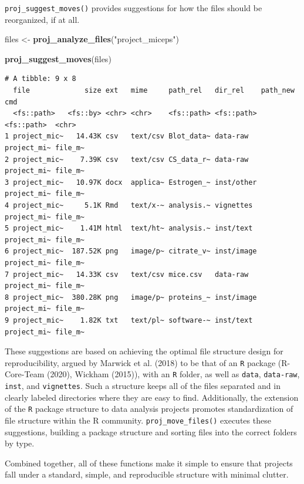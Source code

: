 \documentclass[12pt,twoside]{reedthesis}
\newenvironment{Shaded}{\begin{snugshade}}{\end{snugshade}}
\newcommand{\KeywordTok}[1]{\textcolor[rgb]{0.13,0.29,0.53}{\textbf{#1}}}
\newcommand{\StringTok}[1]{\textcolor[rgb]{0.31,0.60,0.02}{#1}}
\newcommand{\NormalTok}[1]{#1}
\begin{document}
\texttt{proj\_suggest\_moves()} provides suggestions for how the files
should be reorganized, if at all.
\begin{Shaded}
\begin{Highlighting}[]
\NormalTok{files <-}\StringTok{ }\KeywordTok{proj_analyze_files}\NormalTok{(}\StringTok{"project_miceps"}\NormalTok{)}

\KeywordTok{proj_suggest_moves}\NormalTok{(files)}
\end{Highlighting}
\end{Shaded}
\begin{verbatim}
# A tibble: 9 x 8
  file             size ext   mime     path_rel   dir_rel    path_new    cmd    
  <fs::path>   <fs::by> <chr> <chr>    <fs::path> <fs::path> <fs::path>  <chr>  
1 project_mic~   14.43K csv   text/csv Blot_data~ data-raw   project_mi~ file_m~
2 project_mic~    7.39K csv   text/csv CS_data_r~ data-raw   project_mi~ file_m~
3 project_mic~   10.97K docx  applica~ Estrogen_~ inst/other project_mi~ file_m~
4 project_mic~     5.1K Rmd   text/x-~ analysis.~ vignettes  project_mi~ file_m~
5 project_mic~    1.41M html  text/ht~ analysis.~ inst/text  project_mi~ file_m~
6 project_mic~  187.52K png   image/p~ citrate_v~ inst/image project_mi~ file_m~
7 project_mic~   14.33K csv   text/csv mice.csv   data-raw   project_mi~ file_m~
8 project_mic~  380.28K png   image/p~ proteins_~ inst/image project_mi~ file_m~
9 project_mic~    1.82K txt   text/pl~ software-~ inst/text  project_mi~ file_m~
\end{verbatim}
These suggestions are based on achieving the optimal file structure
design for reproducibility, argued by Marwick et al. (2018) to be that
of an \texttt{R} package (R-Core-Team (2020), Wickham (2015)), with an
\texttt{R} folder, as well as \texttt{data}, \texttt{data-raw},
\texttt{inst}, and \texttt{vignettes}. Such a structure keeps all of the
files separated and in clearly labeled directories where they are easy
to find. Additionally, the extension of the \texttt{R} package structure
to data analysis projects promotes standardization of file structure
within the R community. \texttt{proj\_move\_files()} executes these
suggestions, building a package structure and sorting files into the
correct folders by type.

Combined together, all of these functions make it simple to ensure that
projects fall under a standard, simple, and reproducible structure with
minimal clutter.
\end{document}
